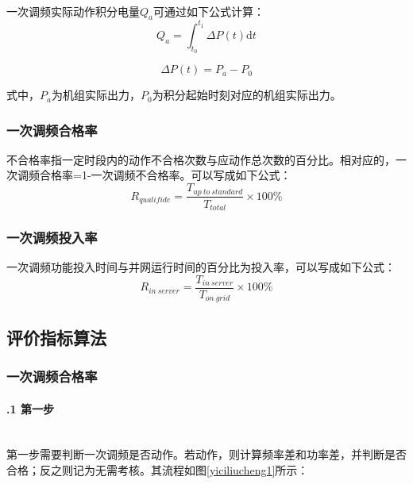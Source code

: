 \documentclass[winfonts,UTF8,a4paper]{ctexart}
\newcommand{\upcite}[1]{\textsuperscript{\textsuperscript{\cite{#1}}}}
\begin{document}
一次调频实际动作积分电量$ Q_{a} $可通过如下公式计算\upcite{李玺2018水电机组一次调频理论动作积分电量优化算法}：
\begin{equation}\label{yctp4}
	Q_{a}=\int_{t_{0}}^{t_{1}}\Delta P(t) \mathrm{d}t
\end{equation}

\begin{equation}\label{yctp5}
	\Delta P(t)=P_{a}-P_{0}
\end{equation}

式中，$ P_{a} $为机组实际出力，$P_{0}  $为积分起始时刻对应的机组实际出力。
\subsubsection{一次调频合格率}
不合格率指一定时段内的动作不合格次数与应动作总次数的百分比。相对应的，一次调频合格率=1-一次调频不合格率。可以写成如下公式：
\begin{equation}\label{yctphgl}
	R_{qualifide}=\frac{T_{up\ to\ standard}}{T_{total}}\times 100\%
\end{equation}

\subsubsection{一次调频投入率}
一次调频功能投入时间与并网运行时间的百分比为投入率，可以写成如下公式：
\begin{equation}\label{yctptrl}
	R_{in\  server}=\frac{T_{in\  server}}{T_{on\  grid}}\times 100\%
\end{equation}

\subsection{评价指标算法}
\subsubsection{一次调频合格率}
\paragraph{\thesubsubsection.1 第一步}\ \\

第一步需要判断一次调频是否动作。若动作，则计算频率差和功率差，并判断是否合格；反之则记为无需考核。其流程如图\ref{yiciliucheng1}所示：
\end{document}

